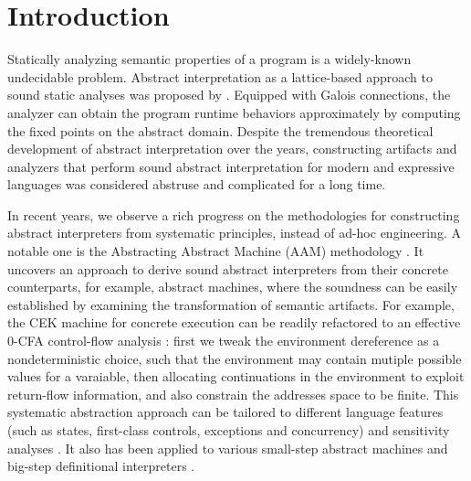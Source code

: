 \section{Introduction} \label{intro}

Statically analyzing semantic properties of a program is a
widely-known undecidable problem. Abstract interpretation as a
lattice-based approach to sound static analyses was proposed
by \citet{DBLP:conf/popl/CousotC77}. Equipped with Galois connections,
the analyzer can obtain the program runtime behaviors approximately
by computing the fixed points on the abstract domain. Despite the tremendous
theoretical development of abstract interpretation over the years,
constructing artifacts and analyzers that perform sound abstract
interpretation for modern and expressive languages was considered
abstruse and complicated for a long time.

In recent years, we observe a rich progress on the methodologies for
constructing abstract interpreters from systematic principles, instead
of ad-hoc engineering. A notable one is the Abstracting Abstract
Machine (AAM) methodology \cite{DBLP:journals/jfp/HornM12,
  DBLP:conf/icfp/HornM10}. It uncovers an approach to derive sound
abstract interpreters from their concrete counterparts, for example,
abstract machines, where the soundness can be easily established by examining
the transformation of semantic artifacts. For example, the CEK machine
\cite{DBLP:conf/popl/FelleisenF87} for concrete execution can be
readily refactored to an effective $0$-CFA control-flow analysis
\cite{Shivers:1988:CFA:53990.54007, Midtgaard:2012:CAF:2187671.2187672}:
first we tweak the environment dereference as a nondeterministic choice,
such that the environment may contain mutiple possible values for a varaiable,
then allocating continuations in the environment to exploit return-flow information,
and also constrain the addresses space to be finite.
This systematic abstraction approach can be tailored to
different language features (such as states, first-class controls,
exceptions and concurrency) and sensitivity analyses
\cite{DBLP:conf/icfp/Gilray0M16, DBLP:conf/popl/GilrayL0MH16,
  Darais:2015:GTM:2814270.2814308}. It also has been applied to various
small-step abstract machines \cite{DBLP:journals/jfp/HornM12,
  DBLP:conf/icfp/HornM10, Sergey:2013:MAI:2491956.2491979} and
big-step definitional interpreters \cite{Wei:2018:RAA:3243631.3236800,
  DBLP:journals/pacmpl/DaraisLNH17, Keidel:2018:CSP:3243631.3236767}.


